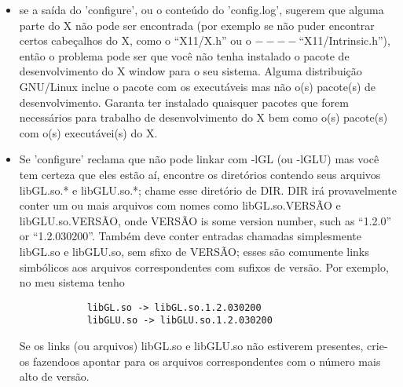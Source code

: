 \documentclass[12pt,a4paper]{article}
\begin{document}
\begin{itemize}
\begin{itemize}
              \item O arquivo 'config.log' queno 'configure' escreve enquanto \'e executado. Esse
                arquivo cont\'em todos os detalhes terr\'ivies sobre os testes que
                'configure' est\'a fazendo. O 'config.log' ir\'a ter mensagens de erro que podem
                indicar por que certos testes falham. IMPORTANTE nota sobre a leitura do
                'config.log': muitos dos testes do configure envolvem la\c{c}os que tentam
                muitas possibilidades --- por exemplo muitas localiza\c{c}\~oes poss\'iveis
                para um arquivo de cabe\c{c}alho. O 'configure' ir\'a escrever um pequeno programa e
                tentar compl\'a-lo uma vez para cada uma dessas localiza\c{c}\~oes, at\'e enconrar
                encontrar uma que trabalhe. Paa cada uma que n\~ao funcionou, ir\~ao existir
                mensagens de erro no arquivo 'config.log'. Quando for ler o
                'config.log', garanta olhar para todos esses testes, n\~ao apenas o
                primeiro deles, durante a tentativa de decidor por que um teste est\'a falhando.
             \end{itemize}
          \item se a sa\'ida do 'configure', ou o conte\'udo do 'config.log',
            sugerem que alguma parte do X n\~ao pode ser encontrada (por exemplo se n\~ao puder
            encontrar certos cabe\c{c}alhos do X, como o ``X11/X.h'' ou o $----$\newline ``X11/Intrinsic.h''),
            ent\~ao o problema pode ser que voc\^e n\~ao tenha instalado o pacote
            de desenvolvimento do X window para o seu sistema. Alguma distribui\c{c}\~ao
            GNU/Linux inclue o pacote com os execut\'aveis mas n\~ao o(s) pacote(s) de
            desenvolvimento. Garanta ter instalado quaisquer pacotes que forem
            necess\'arios para trabalho de desenvolvimento do X bem como o(s) pacote(s) com o(s) execut\'avei(s) do X.

          \item Se 'configure' reclama que n\~ao pode linkar com -lGL (ou -lGLU) mas
            voc\^e tem certeza que eles est\~ao a\'i, encontre os diret\'{o}rios contendo seus
            arquivos libGL.so.* e libGLU.so.*; chame esse diret\'{o}rio de DIR. DIR ir\'a
            provavelmente conter um ou mais arquivos com nomes como libGL.so.VERS\~AO
            e libGLU.so.VERS\~AO, onde VERS\~AO is some version number,
            such as ``1.2.0'' or ``1.2.030200''. Tamb\'em deve conter entradas
            chamadas simplesmente libGL.so e libGLU.so, sem sfixo de VERS\~AO; esses
            s\~ao comumente links simb\'{o}licos aos arquivos correspondentes com sufixos de
            vers\~ao. Por exemplo, no meu sistema tenho
	    \begin{verbatim}
            libGL.so -> libGL.so.1.2.030200
            libGLU.so -> libGLU.so.1.2.030200
	    \end{verbatim}
            Se os links (ou arquivos) libGL.so e libGLU.so n\~ao estiverem presentes,
            crie-os fazendoos apontar para os arquivos correspondentes com
            o n\'umero mais alto de vers\~ao.


\end{itemize}
\end{document}
